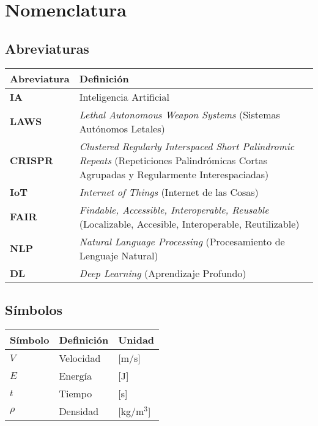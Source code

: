 \chapter*{Nomenclatura}

\section*{Abreviaturas}

\begin{longtable}{p{3cm}p{9cm}}
    \toprule
    \textbf{Abreviatura} & \textbf{Definición} \\
    \midrule\endhead %
    \textbf{IA} & Inteligencia Artificial \\
    \textbf{LAWS} & \textit{Lethal Autonomous Weapon Systems} (Sistemas Autónomos Letales) \\
    \textbf{CRISPR} & \textit{Clustered Regularly Interspaced Short Palindromic Repeats} (Repeticiones Palindrómicas Cortas Agrupadas y Regularmente Interespaciadas) \\
    \textbf{IoT} & \textit{Internet of Things} (Internet de las Cosas) \\
    \textbf{FAIR} & \textit{Findable, Accessible, Interoperable, Reusable} (Localizable, Accesible, Interoperable, Reutilizable) \\
    \textbf{NLP} & \textit{Natural Language Processing} (Procesamiento de Lenguaje Natural) \\
    \textbf{DL} & \textit{Deep Learning} (Aprendizaje Profundo) \\
    \bottomrule
\end{longtable}

\section*{Símbolos}

\begin{longtable}{p{3cm}p{9cm}p{3cm}}
    \toprule
    \textbf{Símbolo} & \textbf{Definición} & \textbf{Unidad} \\
    \midrule\endhead %
    $V$ & Velocidad & [m/s] \\
    $E$ & Energía & [J] \\
    $t$ & Tiempo & [s] \\
    \midrule %
    $\rho$ & Densidad & [kg/m$^3$] \\
    \bottomrule
\end{longtable}

